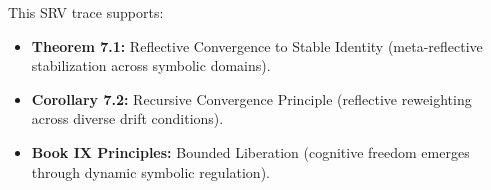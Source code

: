 This SRV trace supports:
\begin{itemize}
    \item \textbf{Theorem 7.1:} Reflective Convergence to Stable Identity (meta-reflective stabilization across symbolic domains).
    \item \textbf{Corollary 7.2:} Recursive Convergence Principle (reflective reweighting across diverse drift conditions).
    \item \textbf{Book IX Principles:} Bounded Liberation (cognitive freedom emerges through dynamic symbolic regulation).
\end{itemize}
